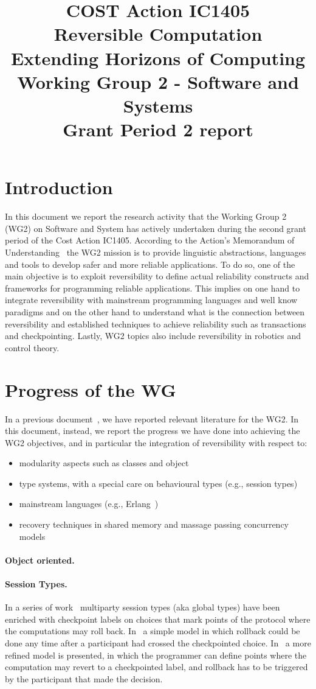 \documentclass[a4paper,oneside]{article}
\title{COST Action IC1405\\Reversible Computation \\ Extending Horizons of Computing \\[3ex]
 Working Group 2 - Software and Systems \\[3ex] Grant Period 2 report }
\begin{document}

\clearpage

\section{Introduction}
In this document we report the research activity that the Working Group 2 (WG2) on Software and System has actively undertaken during the second grant period of the Cost Action IC1405. According to the Action's Memorandum of Understanding~\cite{mou}  the WG2 mission is to provide linguistic abstractions, languages and tools to develop safer and more reliable applications. To do so, one of the main objective is to exploit reversibility to define actual reliability constructs and frameworks for programming reliable applications. This implies on one hand to integrate reversibility with mainstream programming languages and well know paradigms and on the other hand to understand what is the connection between reversibility and established techniques to achieve reliability such as
 transactions and checkpointing. Lastly, WG2 topics also include reversibility in robotics and control theory.



\section{Progress of the WG}
In a previous document~\cite{wg2report}, we have reported  relevant literature for the WG2. In this document, instead, we report   the progress we have done into achieving the WG2 objectives, and in particular the integration of reversibility with respect to:

\begin{itemize}
	\item modularity aspects such as classes and object
	\item type systems, with a special care on behavioural types (e.g., session types)
	\item mainstream languages (e.g., Erlang~\cite{AVW96})
	\item recovery techniques in shared memory and massage passing concurrency models
\end{itemize}

\paragraph{Object oriented.}
  

\paragraph{Session Types.}
In a series of work~\cite{DG16,CDG17}
multiparty session types (aka global types) have been enriched with checkpoint labels on choices that mark points of the protocol where the computations may roll back. In~\cite{DG16}  a simple model in which rollback could be done any time after a participant had crossed the checkpointed choice. In~\cite{CDG17}
 a more refined model is presented, in which  the programmer can define  points where  the computation may revert to a checkpointed label, and rollback has to be triggered by the participant that made the decision. 
 
\end{document}

